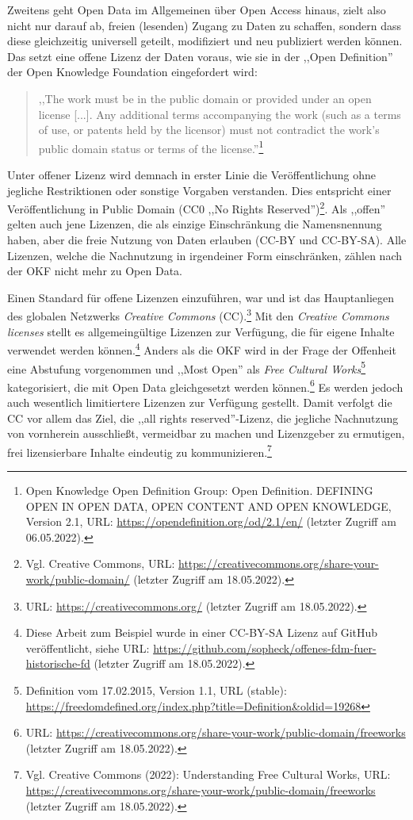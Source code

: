 Zweitens geht Open Data im Allgemeinen über Open Access hinaus, zielt also nicht nur darauf ab, freien (lesenden) Zugang zu Daten zu schaffen, sondern dass diese gleichzeitig universell geteilt, modifiziert und neu publiziert werden können. Das setzt eine offene Lizenz der Daten voraus, wie sie in der ,,Open Definition'' der Open Knowledge Foundation eingefordert wird:

\begin{quote}
,,The work must be in the public domain or provided under an open license [...]. Any additional terms accompanying the work (such as a terms of use, or patents held by the licensor) must not contradict the work’s public domain status or terms of the license.''\footnote{Open Knowledge Open Definition Group: Open Definition. DEFINING OPEN IN OPEN DATA, OPEN CONTENT AND OPEN KNOWLEDGE, Version 2.1, URL: \url{https://opendefinition.org/od/2.1/en/} (letzter Zugriff am 06.05.2022).}
\end{quote}

Unter offener Lizenz wird demnach in erster Linie die Veröffentlichung ohne jegliche Restriktionen oder sonstige Vorgaben verstanden. Dies entspricht einer Veröffentlichung in Public Domain (CC0 ,,No Rights Reserved'')\footnote{Vgl. Creative Commons, URL: \url{https://creativecommons.org/share-your-work/public-domain/} (letzter Zugriff am 18.05.2022).}. Als ,,offen'' gelten auch jene Lizenzen, die als einzige Einschränkung die Namensnennung haben, aber die freie Nutzung von Daten erlauben (CC-BY und CC-BY-SA). Alle Lizenzen, welche die Nachnutzung in irgendeiner Form einschränken, zählen nach der OKF nicht mehr zu Open Data. 

Einen Standard für offene Lizenzen einzuführen, war und ist das Hauptanliegen des globalen Netzwerks \textit{Creative Commons} (CC).\footnote{URL: \url{https://creativecommons.org/} (letzter Zugriff am 18.05.2022).} Mit den \textit{Creative Commons licenses} stellt es allgemeingültige Lizenzen zur Verfügung, die für eigene Inhalte verwendet werden können.\footnote{Diese Arbeit zum Beispiel wurde in einer CC-BY-SA Lizenz auf GitHub veröffentlicht, siehe URL: \url{https://github.com/sopheck/offenes-fdm-fuer-historische-fd} (letzter Zugriff am 18.05.2022).} Anders als die OKF wird in der Frage der Offenheit eine Abstufung vorgenommen und ,,Most Open'' als \textit{Free Cultural Works}\footnote{Definition vom 17.02.2015, Version 1.1, URL (stable): \url{https://freedomdefined.org/index.php?title=Definition&oldid=19268} } kategorisiert, die mit Open Data gleichgesetzt werden können.\footnote{URL: \url{https://creativecommons.org/share-your-work/public-domain/freeworks} (letzter Zugriff am 18.05.2022).} Es werden jedoch auch wesentlich limitiertere Lizenzen zur Verfügung gestellt. Damit verfolgt die CC vor allem das Ziel, die ,,all rights reserved''-Lizenz, die jegliche  Nachnutzung von vornherein ausschließt, vermeidbar zu machen und Lizenzgeber zu ermutigen, frei lizensierbare Inhalte eindeutig zu kommunizieren.\footnote{Vgl. Creative Commons (2022): Understanding Free Cultural Works, URL: \url{https://creativecommons.org/share-your-work/public-domain/freeworks} (letzter Zugriff am 18.05.2022).}

